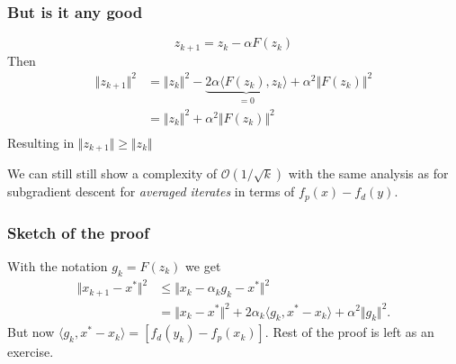 \documentclass{beamer}
\begin{document}
\begin{frame}
  \frametitle{But is it any good}
  \begin{equation}
    z_{k+1} = z_k - \alpha F(z_k)
  \end{equation}
  Then
  \begin{equation}
    \begin{aligned}
      \Vert z_{k+1} \Vert^2 &= \Vert z_k \Vert^2 - \underbrace{2 \alpha \langle F(z_k), z_k \rangle}_{=0} + \alpha^2 \Vert F(z_k) \Vert^2 \\
      &=\Vert z_k \Vert^2 + \alpha^2 \Vert F(z_k) \Vert^2 \\
    \end{aligned}
  \end{equation}
  Resulting in $\Vert z_{k+1} \Vert \ge \Vert z_k \Vert$
  \begin{theorem}
    We can still still show a complexity of $\mathcal{O}(1/\sqrt{k})$ with the same analysis as for subgradient descent for \emph{averaged iterates} in terms of $f_p(x) - f_d(y)$.
  \end{theorem}
\end{frame}

\begin{frame}
  \frametitle{Sketch of the proof}
  With the notation $g_k = F(z_k)$ we get
  \begin{equation}
    \begin{aligned}
      \Vert x_{k+1} - x^* \Vert^2 &\le \Vert x_k - \alpha_k g_k - x^* \Vert^2 \\
      &= \Vert x_k-x^* \Vert^2 + 2 \alpha_k \langle g_k, x^*-x_k \rangle + \alpha^2 \Vert g_k \Vert^2.
    \end{aligned}
  \end{equation}
  But now $\langle g_k, x^* - x_k \rangle = [f_d(y_k) - f_p(x_k)]$.
  Rest of the proof is left as an exercise.

\end{frame}
\end{document}
